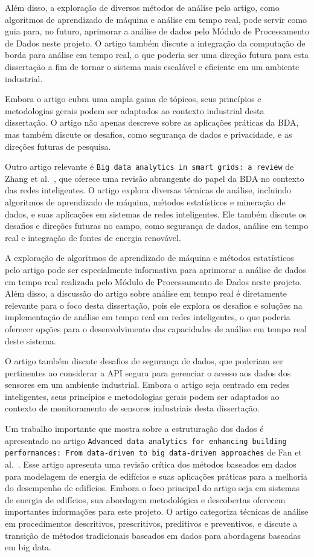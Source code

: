 Além disso, a exploração de diversos métodos de análise pelo artigo, como algoritmos de aprendizado de máquina e análise em tempo real, pode servir como guia para, no futuro, aprimorar a análise de dados pelo Módulo de Processamento de Dados neste projeto. O artigo também discute a integração da computação de borda para análise em tempo real, o que poderia ser uma direção futura para esta dissertação a fim de tornar o sistema mais escalável e eficiente em um ambiente industrial.

Embora o artigo cubra uma ampla gama de tópicos, seus princípios e metodologias gerais podem ser adaptados ao contexto industrial desta dissertação. O artigo não apenas descreve sobre as aplicações práticas da \gls{BDA}, mas também discute os desafios, como segurança de dados e privacidade, e as direções futuras de pesquisa.


Outro artigo relevante é \texttt{Big data analytics in smart grids: a review} de Zhang et al.~\cite{Zhang2018}, que oferece uma revisão abrangente do papel da \gls{BDA} no contexto das redes inteligentes. O artigo explora diversas técnicas de análise, incluindo algoritmos de aprendizado de máquina, métodos estatísticos e mineração de dados, e suas aplicações em sistemas de redes inteligentes. Ele também discute os desafios e direções futuras no campo, como segurança de dados, análise em tempo real e integração de fontes de energia renovável.

A exploração de algoritmos de aprendizado de máquina e métodos estatísticos pelo artigo pode ser especialmente informativa para aprimorar a análise de dados em tempo real realizada pelo Módulo de Processamento de Dados neste projeto. Além disso, a discussão do artigo sobre análise em tempo real é diretamente relevante para o foco desta dissertação, pois ele explora os desafios e soluções na implementação de análise em tempo real em redes inteligentes, o que poderia oferecer opções para o desenvolvimento das capacidades de análise em tempo real deste sistema.

O artigo também discute desafios de segurança de dados, que poderiam ser pertinentes ao considerar a \gls{API} segura para gerenciar o acesso aos dados dos sensores em um ambiente industrial. Embora o artigo seja centrado em redes inteligentes, seus princípios e metodologias gerais podem ser adaptados ao contexto de monitoramento de sensores industriais desta dissertação.

Um trabalho importante que mostra sobre a estruturação dos dados é apresentado no artigo \texttt{Advanced data analytics for enhancing building performances: From data-driven to big data-driven approaches} de Fan et al.~\cite{Fan2021}. Esse artigo apresenta uma revisão crítica dos métodos baseados em dados para modelagem de energia de edifícios e suas aplicações práticas para a melhoria do desempenho de edifícios. Embora o foco principal do artigo seja em sistemas de energia de edifícios, sua abordagem metodológica e descobertas oferecem importantes informações para este projeto. O artigo categoriza técnicas de análise em procedimentos descritivos, prescritivos, preditivos e preventivos, e discute a transição de métodos tradicionais baseados em dados para abordagens baseadas em big data.

